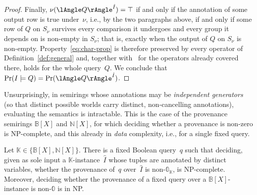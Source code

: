 \begin{proof}
Finally, $\nu(\angsem{\hat I}{Q})=\top$ if and only if the annotation
of some output row is true under~$\nu$, i.e., by the two paragraphs
above, if and only if some row of $Q$ on $S_\nu$ survives every
comparison it undergoes and every group it depends on is non-empty in
$S_\nu$; that is, exactly when the output of $Q$ on $S_\nu$ is non-empty.
Property~\eqref{eq:char-prop} is therefore preserved by every operator of
Definition~\ref{def:general} and, together
with~\cite[Theorem~12]{sen2026provsql} for the operators already covered
there, holds for the whole query~$Q$. We conclude that
$\Pr(I\models Q)=\Pr(\angsem{\hat I}{Q})$.
\end{proof}

Unsurprisingly, in semirings whose annotations may be \emph{independent
generators} (so that distinct possible worlds carry distinct, non-cancelling
annotations), evaluating the  semantics is intractable. This is
the case of the provenance semirings $\mathbb{B}[X]$ and $\mathbb{N}[X]$, for
which deciding whether a provenance is non-zero is NP-complete, and this
already in \emph{data} complexity, i.e., for a single fixed query.

\begin{propositionrep}\label{prop:having-nphard}
  Let $\mathbb{K}\in\{\mathbb{B}[X],\mathbb{N}[X]\}$. There is a fixed
  Boolean  query~$q$ such that deciding, given as sole input a
  $\mathbb{K}$-instance~$\hat I$ whose tuples are annotated by distinct
  variables, whether the provenance of~$q$ over~$\hat I$ is
  non-$\mathbb{0}_\mathbb{K}$, is NP-complete. Moreover, deciding whether
  the provenance of a fixed  query over a
  $\mathbb B[X]$-instance is non-$\mathbb 0$ is in NP.
\end{propositionrep}

